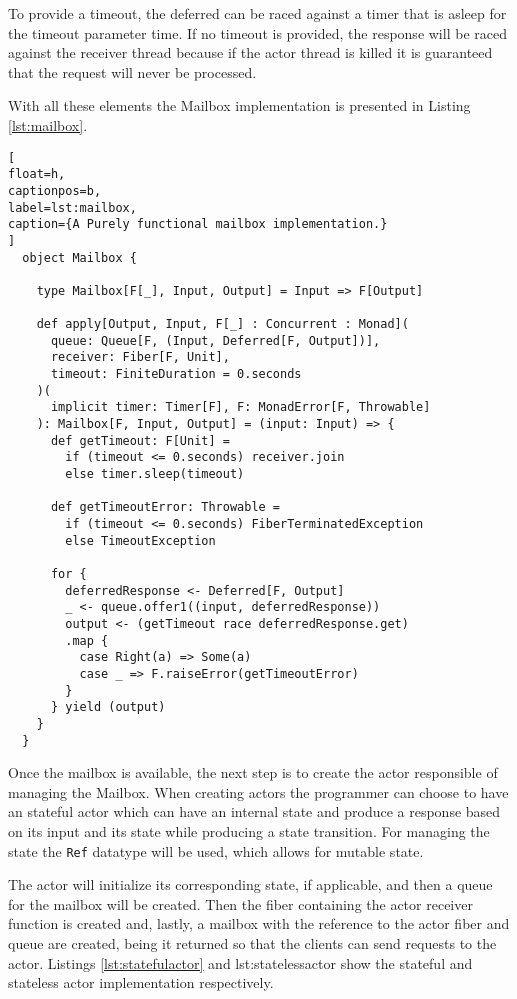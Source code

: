 \documentclass[../main.tex]{subfiles}
\begin{document}
To provide a timeout, the deferred can be raced against a timer that is
asleep for the timeout parameter time. If no timeout is provided, the response
will be raced against the receiver thread because if the actor thread is killed
it is guaranteed that the request will never be processed.

With all these elements the Mailbox implementation is presented in Listing
\ref{lst:mailbox}.


\begin{lstlisting}[
float=h,
captionpos=b,
label=lst:mailbox,
caption={A Purely functional mailbox implementation.}
]
  object Mailbox {

    type Mailbox[F[_], Input, Output] = Input => F[Output]

    def apply[Output, Input, F[_] : Concurrent : Monad](
      queue: Queue[F, (Input, Deferred[F, Output])],
      receiver: Fiber[F, Unit],
      timeout: FiniteDuration = 0.seconds
    )(
      implicit timer: Timer[F], F: MonadError[F, Throwable]
    ): Mailbox[F, Input, Output] = (input: Input) => {
      def getTimeout: F[Unit] =
        if (timeout <= 0.seconds) receiver.join
        else timer.sleep(timeout)

      def getTimeoutError: Throwable =
        if (timeout <= 0.seconds) FiberTerminatedException
        else TimeoutException

      for {
        deferredResponse <- Deferred[F, Output]
        _ <- queue.offer1((input, deferredResponse))
        output <- (getTimeout race deferredResponse.get)
        .map {
          case Right(a) => Some(a)
          case _ => F.raiseError(getTimeoutError)
        }
      } yield (output)
    }
  }
\end{lstlisting}

Once the mailbox is available, the next step is to create the actor responsible
of managing the Mailbox. When creating actors the programmer can choose to have
an stateful actor which can have an internal state and produce a response based
on its input and its state while producing a state transition. For managing the
state the \texttt{Ref} datatype \autocite{Cats-effectCats.effect.concurrent.Ref} will be
used, which allows for mutable state.

The actor will initialize its corresponding state, if applicable, and then a queue
for the mailbox will be created. Then the fiber containing the actor receiver function is
created and, lastly, a mailbox with the reference to the actor fiber and queue are
created, being it returned so that the clients can send requests to the actor.
Listings \ref{lst:statefulactor} and {lst:statelessactor} show the
stateful and stateless actor implementation respectively.
\end{document}
